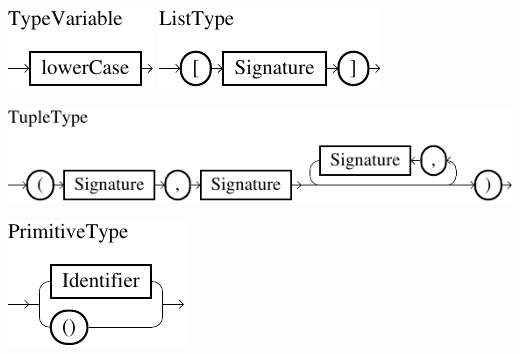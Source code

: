 \documentclass[%
	latex,%
	a4paper,%
	oneside,%
	chapterprefix,%
	headsepline,%
	12pt%
]{scrbook}
\begin{document}
\begin{minipage}{0.85\textwidth}
\begin{minipage}[t]{0.5\textwidth}
\vspace{1cm}
\includegraphics{bilder/TypeVariable}
\includegraphics{bilder/ListType}
\end{minipage}

\vspace{0.5cm}
\begin{minipage}{0.5\textwidth}
\includegraphics{bilder/TupleType}
\end{minipage}
\hspace{3.25cm}
\begin{minipage}{0.5\textwidth}
\vspace{0.25cm}
\includegraphics{bilder/PrimitiveType}
\end{minipage}

\end{minipage}
\end{document}
